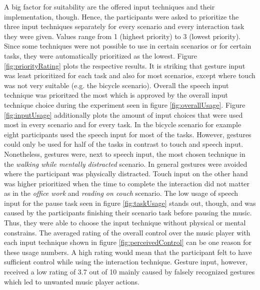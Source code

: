 A big factor for suitability are the offered input techniques and their implementation, though. 
Hence, the participants were asked to prioritize the three input techniques separately for every scenario and every interaction task they were given. 
Values range from 1 (highest priority) to 3 (lowest priority). 
Since some techniques were not possible to use in certain scenarios or for certain tasks, they were automatically prioritized as the lowest. 
Figure \ref{fig:priorityRating} plots the respective results. 
It is striking that gesture input was least prioritized for each task and also for most scenarios, except where touch was not very suitable (e.g. the bicycle scenario). 
Overall the speech input technique was prioritzed the most which is approved by the overall input technique choice during the experiment seen in figure \ref{fig:overallUsage}. 
Figure \ref{fig:inputUsage} additionally plots the amount of input choices that were used most in every scenario and for every task. 
In the bicycle scenario for example eight participants used the speech input for most of the tasks. 
However, gestures could only be used for half of the tasks in contrast to touch and speech input. 
Nonetheless, gestures were, next to speech input, the most chosen technique in the \textit{walking while mentally distracted} scenario. 
In general gestures were avoided where the participant was physically distracted. 
Touch input on the other hand was higher prioritized when the time to complete the interaction did not matter as in the \textit{office work} and \textit{reading on couch} scenario. 
The low usage of speech input for the pause task seen in figure \ref{fig:taskUsage} stands out, though, and was caused by the participants finishing their scenario task before pausing the music. 
Thus, they were able to choose the input technique without physical or mental constrains. 
The averaged rating of the overall control over the music player with each input technique shown in figure \ref{fig:perceivedControl} can be one reason for these usage numbers. 
A high rating would mean that the participant felt to have sufficient control while using the interaction technique. 
Gesture input, however, received a low rating of 3.7 out of 10 mainly caused by falsely recognized gestures which led to unwanted music player actions.

